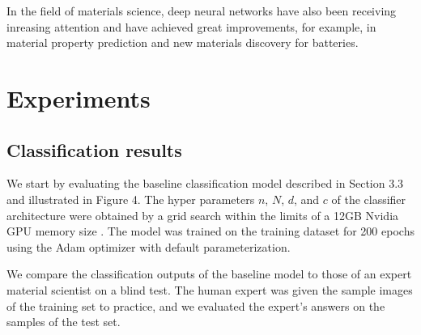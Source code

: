 \documentclass[10pt,twocolumn,letterpaper]{article}
\begin{document}
In the field of materials science, deep neural networks have also been receiving inreasing attention and have achieved great improvements, for example, in material property prediction and new materials discovery for batteries.

\section{Experiments}

\subsection{Classification results}
% 
We start by evaluating the baseline classification model described in Section 3.3 and illustrated in Figure 4.
The hyper parameters $n$, $N$, $d$, and $c$ of the classifier architecture 
were obtained by a grid search within the limits of a 12GB Nvidia GPU memory size .
The model was trained on the training dataset for 200 epochs using the Adam optimizer with default parameterization.

We compare the classification outputs of the baseline model to those 
of an expert material scientist on a blind test.
The human expert was given the sample images of the training set to practice,
and we evaluated the expert's answers on the samples of the test set.
\end{document}
